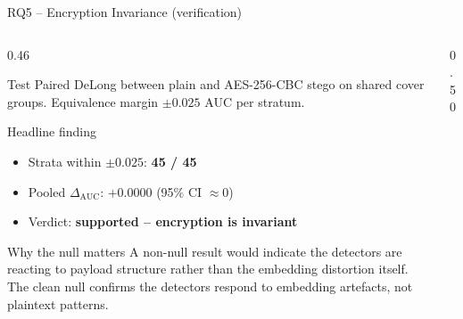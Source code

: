 \documentclass[aspectratio=169,11pt]{beamer}
\begin{document}
\begin{frame}{RQ5 -- Encryption Invariance (verification)}
\scriptsize
\begin{columns}[T]
\begin{column}{0.46\textwidth}
\begin{block}{Test}
Paired DeLong between plain and AES-256-CBC stego on shared cover groups. Equivalence margin $\pm 0.025$ AUC per stratum.
\end{block}
\begin{block}{Headline finding}
\begin{itemize}\setlength{\itemsep}{1pt}
\item Strata within $\pm 0.025$: \textbf{45 / 45}
\item Pooled $\Delta_\text{AUC}$: $\boldsymbol{+0.0000}$ (95\% CI $\approx 0$)
\item Verdict: \textbf{supported -- encryption is invariant}
\end{itemize}
\end{block}
\begin{exampleblock}{Why the null matters}
A non-null result would indicate the detectors are reacting to payload structure rather than the embedding distortion itself. The clean null confirms the detectors respond to embedding artefacts, not plaintext patterns.
\end{exampleblock}
\end{column}
\begin{column}{0.50\textwidth}
\begin{center}
\end{center}
\end{column}
\end{columns}
\end{frame}
\end{document}
